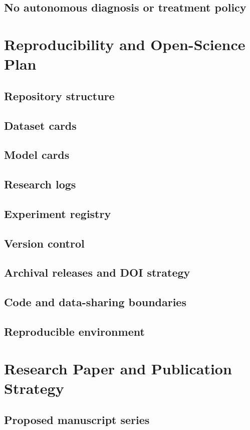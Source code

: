 \documentclass[11pt,journal,onecolumn,draftclsnofoot]{IEEEtran}
\begin{document}
\subsection{No autonomous diagnosis or treatment policy}

\section{Reproducibility and Open-Science Plan}
\subsection{Repository structure}
\subsection{Dataset cards}
\subsection{Model cards}
\subsection{Research logs}
\subsection{Experiment registry}
\subsection{Version control}
\subsection{Archival releases and DOI strategy}
\subsection{Code and data-sharing boundaries}
\subsection{Reproducible environment}

\section{Research Paper and Publication Strategy}
\subsection{Proposed manuscript series}
\end{document}
